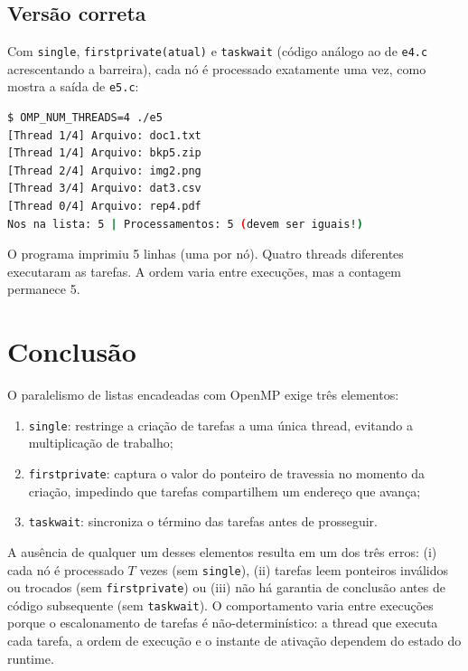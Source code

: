\documentclass[11pt,letterpaper]{article}
\begin{document}
\subsection{Versão correta}

Com \texttt{single}, \texttt{firstprivate(atual)} e \texttt{taskwait} (código análogo ao de \texttt{e4.c} acrescentando a barreira), cada nó é processado exatamente uma vez, como mostra a saída de \texttt{e5.c}:

\begin{lstlisting}[language=bash, caption={Execução da versão correta com 4 threads}]
$ OMP_NUM_THREADS=4 ./e5
[Thread 1/4] Arquivo: doc1.txt
[Thread 1/4] Arquivo: bkp5.zip
[Thread 2/4] Arquivo: img2.png
[Thread 3/4] Arquivo: dat3.csv
[Thread 0/4] Arquivo: rep4.pdf
Nos na lista: 5 | Processamentos: 5 (devem ser iguais!)
\end{lstlisting}

O programa imprimiu 5 linhas (uma por nó). Quatro threads diferentes executaram as tarefas. A ordem varia entre execuções, mas a contagem permanece 5.

\section{Conclusão}

O paralelismo de listas encadeadas com OpenMP exige três elementos:

\begin{enumerate}
    \item \texttt{single}: restringe a criação de tarefas a uma única thread, evitando a multiplicação de trabalho;
    \item \texttt{firstprivate}: captura o valor do ponteiro de travessia no momento da criação, impedindo que tarefas compartilhem um endereço que avança;
    \item \texttt{taskwait}: sincroniza o término das tarefas antes de prosseguir.
\end{enumerate}

A ausência de qualquer um desses elementos resulta em um dos três erros: (i) cada nó é processado $T$ vezes (sem \texttt{single}), (ii) tarefas leem ponteiros inválidos ou trocados (sem \texttt{firstprivate}) ou (iii) não há garantia de conclusão antes de código subsequente (sem \texttt{taskwait}). O comportamento varia entre execuções porque o escalonamento de tarefas é não-determinístico: a thread que executa cada tarefa, a ordem de execução e o instante de ativação dependem do estado do runtime.
\end{document}
